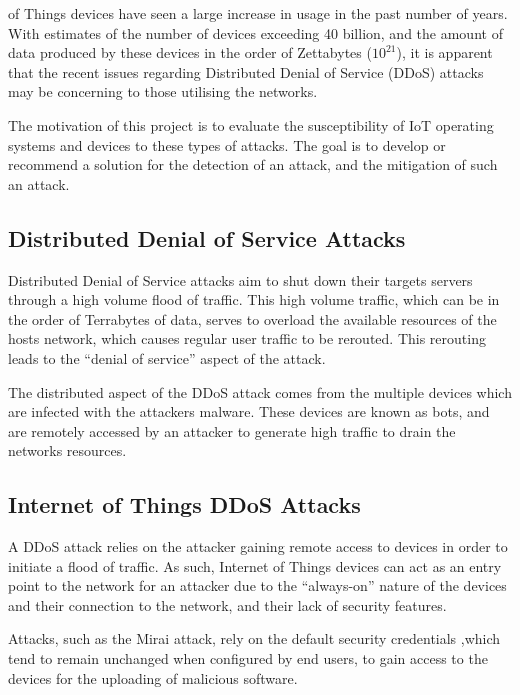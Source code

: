  of Things devices have seen a large increase in usage
in the past number of years. With estimates of the number of devices exceeding
40 billion\cite{idc_2019}, and the amount of data produced by these devices in the order
of Zettabytes\cite{idc_2019} ($10^{21}$), it is apparent that the recent issues
regarding Distributed Denial of Service (DDoS) attacks may be concerning to
those utilising the networks.

The motivation of this project is to evaluate the susceptibility of IoT
operating systems and devices to these types of attacks. The goal is to develop
or recommend a solution for the detection of an attack, and the mitigation of
such an attack.

\subsection{Distributed Denial of Service Attacks}

Distributed Denial of Service attacks aim to shut down their targets servers
through a high volume flood of traffic. This high volume traffic, which can be
in the order of Terrabytes of data, serves to overload the available resources
of the hosts network, which causes regular user traffic to be rerouted. This
rerouting leads to the ``denial of service'' aspect of the attack.

The distributed aspect of the DDoS attack comes from the multiple devices which
are infected with the attackers malware. These devices are known as bots, and
are remotely accessed by an attacker to generate high traffic to drain the
networks resources.


\subsection{Internet of Things DDoS Attacks}

A DDoS attack relies on the attacker gaining remote access to devices in order
to initiate a flood of traffic. As such, Internet of Things devices can act as
an entry point to the network for an attacker due to the ``always-on'' nature of
the devices and their connection to the network, and their lack of security
features.

Attacks, such as the Mirai attack, rely on the default security credentials
,which tend to remain unchanged when configured by end users, to gain access to
the devices for the uploading of malicious software\cite{7971869}.

